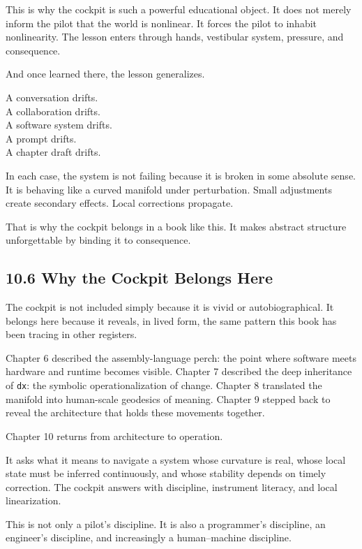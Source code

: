 This is why the cockpit is such a powerful educational object. It does
not merely inform the pilot that the world is nonlinear. It forces the
pilot to inhabit nonlinearity. The lesson enters through hands,
vestibular system, pressure, and consequence.

And once learned there, the lesson generalizes.

A conversation drifts.\\
A collaboration drifts.\\
A software system drifts.\\
A prompt drifts.\\
A chapter draft drifts.

In each case, the system is not failing because it is broken in some
absolute sense. It is behaving like a curved manifold under
perturbation. Small adjustments create secondary effects. Local
corrections propagate.

That is why the cockpit belongs in a book like this. It makes abstract
structure unforgettable by binding it to consequence.

\hypertarget{why-the-cockpit-belongs-here}{%
\subsection{10.6 Why the Cockpit Belongs
Here}\label{why-the-cockpit-belongs-here}}

The cockpit is not included simply because it is vivid or
autobiographical. It belongs here because it reveals, in lived form, the
same pattern this book has been tracing in other registers.

Chapter 6 described the assembly-language perch: the point where
software meets hardware and runtime becomes visible. Chapter 7 described
the deep inheritance of \texttt{dx}: the symbolic operationalization of
change. Chapter 8 translated the manifold into human-scale geodesics of
meaning. Chapter 9 stepped back to reveal the architecture that holds
these movements together.

Chapter 10 returns from architecture to operation.

It asks what it means to navigate a system whose curvature is real,
whose local state must be inferred continuously, and whose stability
depends on timely correction. The cockpit answers with discipline,
instrument literacy, and local linearization.

This is not only a pilot's discipline. It is also a programmer's
discipline, an engineer's discipline, and increasingly a human--machine
discipline.


